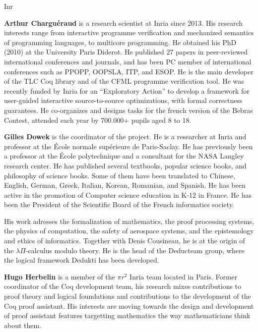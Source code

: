 \begin{sitedescription}{Inr}
\begin{compactitem}
\item{\bf Arthur Charguéraud} is a research scientist at Inria since 2013.
His research interests range from interactive programme verification and mechanized
semantics of programming languages, to multicore programming.
He obtained his PhD (2010) at the University Paris Diderot. He published 27 papers
in peer-reviewed international conferences and journals, and has been PC member
of international conferences such as PPOPP, OOPSLA, ITP, and ESOP. He is the main
developer of the TLC Coq library and of the CFML programme verification tool.
He was recently funded by Inria for an ``Exploratory Action'' to develop a framework
for user-guided interactive source-to-source optimizations, with formal correctness
guarantees.
He co-organizes and designs tasks for the french version of the Bebras Contest,
attended each year by 700.000+ pupils aged 8 to 18.

\item{\bf Gilles Dowek} is the coordinator of the project.
He is a researcher at Inria and professor at the École
normale supérieure de Paris-Saclay. He has previously been a professor
at the École polytechnique and a consultant for the NASA Langley
research center. He has published several textbooks, popular science
books, and philosophy of science books. Some of them have been
translated to Chinese, English, German, Greek, Italian, Korean,
Romanian, and Spanish. He has been active in the promotion of
Computer science education in K-12 in France. He has been the
President of the Scientific Board of the French informatics society.

His work adresses the formalization of mathematics, the proof
processing systems, the physics of computation, the safety of
aerospace systems, and the epistemology and ethics of informatics.
Together with Denis Cousineau, he is at the origin of the
$\lambda\Pi$-calculus modulo theory. He is the head of the Deducteam
group, where the logical framework Dedukti has been developed.

\item{\bf Hugo Herbelin} is a member of the $\pi r^2$ Inria team
located in Paris. Former coordinator of the Coq development team,
his research mixes contributions to proof theory and logical
foundations and contributions to the development of the Coq proof
assistant. His interests are moving towards the design and development
of proof assistant features targetting mathematics the way
mathematicians think about them.


\end{compactitem}
\end{sitedescription}
